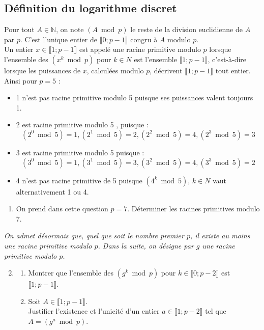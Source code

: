 \documentclass[landscape,twocolumn,leqno,a4paper,10pt]{report} %
\newcommand\n{\noindent}
\begin{document}
\subsection{Définition du logarithme discret}

\n Pour tout $A \in \mathbb{N}$, on note $(A \bmod p)$ le reste de la division euclidienne de $A$ par $p$. C'est l'unique entier de $\llbracket 0 ; p-1\rrbracket$ congru à $A$ modulo $p$.\\
Un entier $x \in\llbracket 1 ; p-1\rrbracket$ est appelé une racine primitive modulo $p$ lorsque l'ensemble des $\left(x^{k} \bmod p\right)$ pour $k \in N$ est l'ensemble $\llbracket 1 ; p-1\rrbracket$, c'est-à-dire lorsque les puissances de $x$, calculées modulo $p$, décrivent $\llbracket 1 ; p-1\rrbracket$ tout entier.\\

\n Ainsi pour $p=5$ :
\begin{itemize}
	\item 1 n'est pas racine primitive modulo 5 puisque ses puissances valent toujours 1.
	\item 2 est racine primitive modulo 5 , puisque :
	$$\left(2^{0} \bmod 5\right)=1,\left(2^{1} \bmod 5\right)=2,\left(2^{2} \bmod 5\right)=4, \left(2^{3} \bmod 5\right)=3$$
	\item 3 est racine primitive modulo 5 puisque : 
	$$\left(3^{0} \bmod 5\right)=1,\left(3^{1} \bmod 5\right)=3,\left(3^{2} \bmod 5\right)=4,\left(3^{3} \bmod 5\right)=2$$
	\item 4 n'est pas racine primitive de 5 puisque $\left(4^{k} \bmod 5\right)$, $k \in N$ vaut alternativement 1 ou 4.
\end{itemize}

\begin{enumerate}
	\item On prend dans cette question $p=7$. Déterminer les racines primitives modulo 7.
\end{enumerate}	

\n \textit{On admet désormais que, quel que soit le nombre premier $p$, il existe au moins une racine primitive modulo $p$. Dans la suite, on désigne par $g$ une racine primitive modulo $p$.}

\begin{enumerate}\setcounter{enumi}{1}
	\item \begin{enumerate}
		\item Montrer que l'ensemble des $\left(g^{k} \bmod p\right)$ pour $k \in\llbracket 0 ; p-2\rrbracket$ est $\llbracket 1 ; p-1\rrbracket$.
		\item Soit $A \in\llbracket 1 ; p-1\rrbracket$.\\
		Justifier l'existence et l'unicité d'un entier $a \in\llbracket 1 ; p-2\rrbracket$ tel que $A=\left(g^{a} \bmod p\right)$.
	\end{enumerate}
\end{enumerate}	
\end{document}

